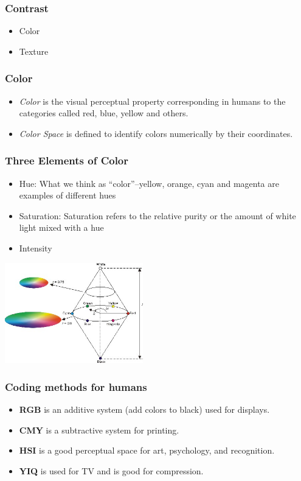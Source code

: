 \documentclass[notheorems,serif,table,compress]{beamer}  %
\begin{document}
\begin{frame}
\frametitle{Contrast}
\begin{itemize}
\item Color
\item Texture
\end{itemize}
\end{frame}


\begin{frame}
\frametitle{Color}
\begin{itemize}
\item {\color{blue}\emph{Color}} is the visual perceptual property corresponding in humans to the categories called red, blue, yellow and others.
\item {\color{blue}\emph{Color Space}} is defined to identify colors numerically by their coordinates.
\end{itemize}
\end{frame}


\begin{frame}
\frametitle{Three Elements of Color}
\begin{itemize}
\item Hue: What we think as ``color''--yellow, orange, cyan and magenta are examples of different hues
\item Saturation: Saturation refers to the relative purity or the amount of white light mixed with a hue
\item Intensity
\end{itemize}
\centering\includegraphics[width=6cm]{HSIColorModel.jpg}
\end{frame}


\begin{frame}
\frametitle{Coding methods for humans}
\begin{itemize}
\item \textbf{RGB} is an additive system (add colors to black) used for displays.
\item \textbf{CMY} is a subtractive system for printing.
\item \textbf{HSI} is a good perceptual space for art, psychology, and recognition.
\item \textbf{YIQ} is used for TV and is good for compression. 
\end{itemize}
\end{frame}
\end{document}

